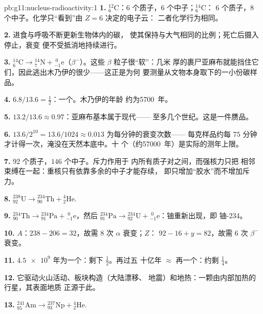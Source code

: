 \begin{solution}{pb:g11:nucleus-radioactivity:1}
\textbf{1.} ${}^{12}_{6}\mathrm{C}$：$6$ 个质子，$6$ 个中子；${}^{14}_{6}\mathrm{C}$：
$6$ 个质子，$8$ 个中子。化学只“看到”由 $Z = 6$ 决定的电子云：
二者化学行为相同。

\textbf{2.} 进食与呼吸不断更新生物体内的碳，
使其保持与大气相同的比例；死亡后摄入停止，衰变
便不受抵消地持续进行。

\textbf{3.} ${}^{14}_{6}\mathrm{C} \to {}^{14}_{7}\mathrm{N} +
{}^{\;0}_{-1}\mathrm{e}$（$\beta^-$）。这些 $\beta$ 粒子很“软”：几米
厚的裹尸亚麻布就能挡住它们，因此逃出木乃伊的很少——这正是为何
要测量从文物本身取下的一小份碳样品。

\textbf{4.} $6.8/13.6 = \frac12$：一个。木乃伊的年龄
约为\num{5700}~年。

\textbf{5.} $13.2/13.6 \approx 0.97$：亚麻布基本属于现代——
至多几个世纪。这是一件赝品。

\textbf{6.} $13.6/2^{10} = 13.6/1024 \approx 0.013$ 为每分钟的衰变次数——
每克样品约每 $75$ 分钟才计得一次，淹没在天然本底中。十
个（约\num{57000}~年）是实际的测年上限。

\textbf{7.} $92$ 个质子，$146$ 个中子。斥力作用于
内所有质子对之间，而强核力只把
相邻束缚在一起：重核只有依靠多余的中子才能存续，
即只增加“胶水”而不增加斥力。

\textbf{8.} ${}^{238}_{92}\mathrm{U} \to {}^{234}_{90}\mathrm{Th} +
{}^{4}_{2}\mathrm{He}$.

\textbf{9.} ${}^{234}_{90}\mathrm{Th} \to {}^{234}_{91}\mathrm{Pa} +
{}^{\;0}_{-1}\mathrm{e}$，然后 ${}^{234}_{91}\mathrm{Pa} \to
{}^{234}_{92}\mathrm{U} + {}^{\;0}_{-1}\mathrm{e}$：铀重新出现，即
铀-234。

\textbf{10.} $A$：$238 - 206 = 32$，故需 $8$ 次 $\alpha$ 衰变；$Z$：
$92 - 16 + y = 82$，故需 $6$ 次 $\beta^-$ 衰变。

\textbf{11.} $\num{4.5e9}$ 年为一个：剩下 $\frac12$。再过五
十亿年 $\approx$ 再一个：约剩 $\frac14$。

\textbf{12.} 它驱动火山活动、板块构造（大陆漂移、
地震）和地热：一颗由内部加热的行星，其表面地质
正源于此。

\textbf{13.} ${}^{241}_{95}\mathrm{Am} \to {}^{237}_{93}\mathrm{Np} +
{}^{4}_{2}\mathrm{He}$.


\end{solution}
